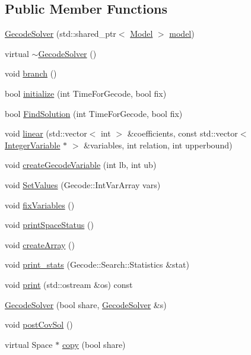 \subsection*{Public Member Functions}
\begin{DoxyCompactItemize}
\item 
\hyperlink{class_gecode_solver_a79cd5fe79ac280dbc2d08a19552e22b7}{Gecode\-Solver} (std\-::shared\-\_\-ptr$<$ \hyperlink{class_model}{Model} $>$ \hyperlink{class_gecode_solver_a76210bf2a7eda291bf319971c0285fad}{model})
\item 
virtual \hyperlink{class_gecode_solver_aca5782c9a916038f0c59188508b0c703}{$\sim$\-Gecode\-Solver} ()
\item 
void \hyperlink{class_gecode_solver_aa3993533d534a437124fd75d2ab82425}{branch} ()
\item 
bool \hyperlink{class_gecode_solver_a3448f02748ee295111ded23cf90d6432}{initialize} (int Time\-For\-Gecode, bool fix)
\item 
bool \hyperlink{class_gecode_solver_a3c76a8f136a709f6984d23f399e6df3d}{Find\-Solution} (int Time\-For\-Gecode, bool fix)
\item 
void \hyperlink{class_gecode_solver_aa3fdaf0ff92e99bf1dd860d07cbac476}{linear} (std\-::vector$<$ int $>$ \&coefficients, const std\-::vector$<$ \hyperlink{class_integer_variable}{Integer\-Variable} $\ast$ $>$ \&variables, int relation, int upperbound)
\item 
void \hyperlink{class_gecode_solver_abcc193eafcc56a9b2a016c5831aaba9b}{create\-Gecode\-Variable} (int lb, int ub)
\item 
void \hyperlink{class_gecode_solver_a2e5913170cc34f8dca9eefd59448b5fe}{Set\-Values} (Gecode\-::\-Int\-Var\-Array vars)
\item 
void \hyperlink{class_gecode_solver_ad6198e37b78ec02a209d3e1f1bd6c929}{fix\-Variables} ()
\item 
void \hyperlink{class_gecode_solver_a768bbd3433d5c117fee99fcb554c87f5}{print\-Space\-Status} ()
\item 
void \hyperlink{class_gecode_solver_a8d16b569596eea5f47593ff03081025f}{create\-Array} ()
\item 
void \hyperlink{class_gecode_solver_a467af2791eed920c71e20b04e3d1c9c7}{print\-\_\-stats} (Gecode\-::\-Search\-::\-Statistics \&stat)
\item 
void \hyperlink{class_gecode_solver_a98286c7c09071746fc56e2e72175e0eb}{print} (std\-::ostream \&os) const 
\item 
\hyperlink{class_gecode_solver_a2215c9143fdfc572effa82a0764515dd}{Gecode\-Solver} (bool share, \hyperlink{class_gecode_solver}{Gecode\-Solver} \&s)
\item 
void \hyperlink{class_gecode_solver_ae9c28efac68fd3a7758078f3d859d821}{post\-Cov\-Sol} ()
\item 
virtual Space $\ast$ \hyperlink{class_gecode_solver_ac096dd0516b86a4aa290a8403aa56c5b}{copy} (bool share)
\end{DoxyCompactItemize}
